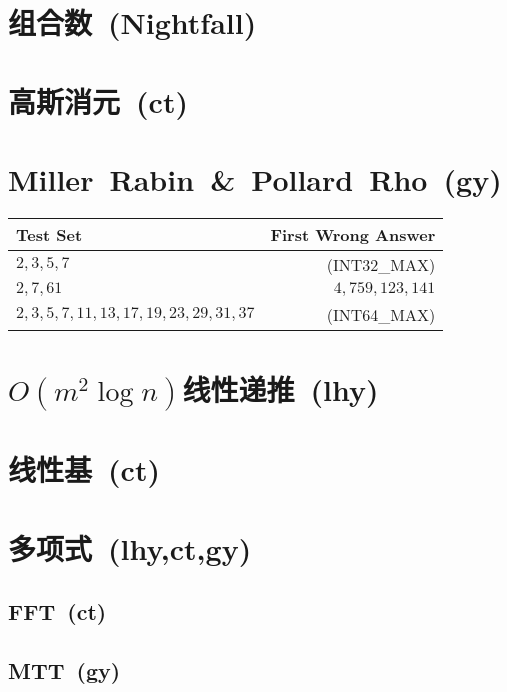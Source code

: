 \section{组合数\ \small(Nightfall)}

\section{高斯消元\ \small(ct)}

\section{Miller\ Rabin\ \&\ Pollard\ Rho\ \small(gy)}
    \begin{tabular}{l r}
        \hline
        Test Set & First Wrong Answer\\\hline
        $ 2, 3, 5, 7 $ & (INT32\_MAX)\\\hline
        $ 2, 7, 61 $ & $ 4,759,123,141 $\\\hline
        $ 2, 3, 5, 7, 11, 13, 17, 19, 23, 29, 31, 37 $ & (INT64\_MAX)\\\hline
    \end{tabular}

\section{$ O(m ^ 2 \log n) $线性递推\ \small(lhy)}

\section{线性基\ \small(ct)}

\section{多项式\ \small(lhy,ct,gy)}
    \subsection*{FFT\ \small(ct)}
    \subsection*{MTT\ \small(gy)}

